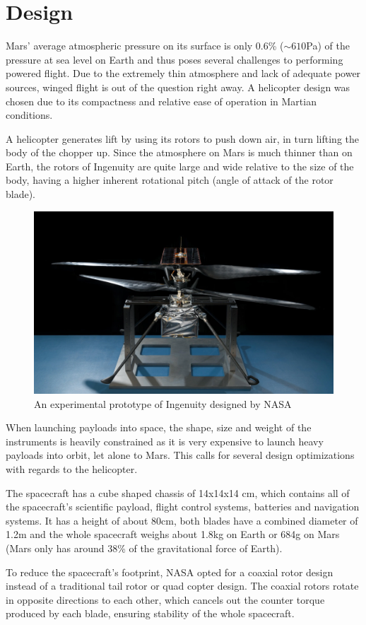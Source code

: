 \documentclass[preprint,12pt]{elsarticle}
\begin{document}
\section{Design}
\label{S:2}

Mars’ average atmospheric pressure on its surface is only 0.6\% ($\sim 610$Pa) of the pressure at sea level on Earth and thus poses several challenges to performing powered flight. Due to the extremely thin atmosphere and lack of adequate power sources, winged flight is out of the question right away. A helicopter design was chosen due to its compactness and relative ease of operation in Martian conditions. 

A helicopter generates lift by using its rotors to push down air, in turn lifting the body of the chopper up.
Since the atmosphere on Mars is much thinner than on Earth, the rotors of Ingenuity are quite large and wide relative to the size of the body, having a higher inherent rotational pitch (angle of attack of the rotor blade). 

\begin{figure}[h]
\centering\includegraphics[width=0.4\linewidth]{Ingenuity.png}
\caption{An experimental prototype of Ingenuity designed by NASA}
\end{figure}


When launching payloads into space, the shape, size and weight of the instruments is heavily constrained as it is very expensive to launch heavy payloads into orbit, let alone to Mars. This calls for several design optimizations with regards to the helicopter. \par

The spacecraft has a cube shaped chassis of 14x14x14 cm, which contains all of the spacecraft’s scientific payload, flight control systems, batteries and navigation systems.
 It has a height of about 80cm, both blades have a combined diameter of 1.2m and the whole spacecraft weighs about 1.8kg on Earth or 684g on Mars (Mars only has around 38\% of the gravitational force of Earth).\par

To reduce the spacecraft’s footprint, NASA opted for a coaxial rotor design instead of a traditional tail rotor or quad copter design. The coaxial rotors rotate in opposite directions to each other, which cancels out the counter torque produced by each blade, ensuring stability of the whole spacecraft. \par
\end{document}
